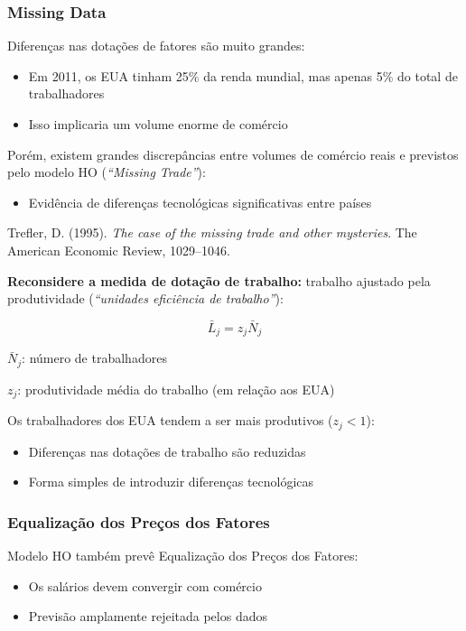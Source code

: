 \documentclass[a4paper,12pt]{article}[abntex2]
\begin{document}
\subsubsection{\textbf{Missing Data}}

Diferenças nas dotações de fatores são muito grandes:
    \begin{itemize}
        \item Em 2011, os EUA tinham 25\% da renda mundial, mas apenas 5\% do total de trabalhadores
        \item Isso implicaria um volume enorme de comércio
    \end{itemize}

Porém, existem grandes discrepâncias entre volumes de comércio reais e previstos pelo modelo HO (\textit{``Missing Trade''}):
    \begin{itemize}
        \item Evidência de diferenças tecnológicas significativas entre países
    \end{itemize}

Trefler, D. (1995). \textit{The case of the missing trade and other mysteries}. The American Economic Review, 1029--1046.

\textbf{Reconsidere a medida de dotação de trabalho:} trabalho ajustado pela produtividade (\textit{``unidades eficiência de trabalho''}):

\[
\bar{L}_j = z_j \bar{N}_j
\]

$\bar{N}_j$: número de trabalhadores

$z_j$: produtividade média do trabalho (em relação aos EUA)

Os trabalhadores dos EUA tendem a ser mais produtivos ($z_j < 1$):
\begin{itemize}
    \item Diferenças nas dotações de trabalho são reduzidas
    \item Forma simples de introduzir diferenças tecnológicas
\end{itemize}


\subsubsection{\textbf{Equalização dos Preços dos Fatores}}

Modelo HO também prevê Equalização dos Preços dos Fatores:
\begin{itemize}
    \item Os salários devem convergir com comércio
    \item Previsão amplamente rejeitada pelos dados
\end{itemize}
\end{document}
